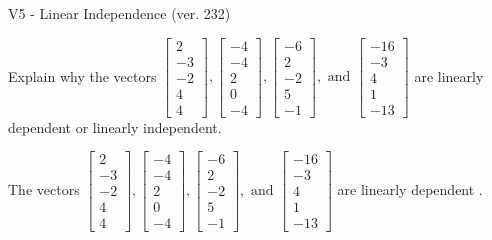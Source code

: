 \begin{exercise}
  \begin{exerciseTitle}V5 - Linear Independence (ver. 232)\end{exerciseTitle}
  \begin{exerciseStatement}
    Explain why the vectors \(\left[\begin{array}{r}
2 \\
-3 \\
-2 \\
4 \\
4
\end{array}\right] , \left[\begin{array}{r}
-4 \\
-4 \\
2 \\
0 \\
-4
\end{array}\right] , \left[\begin{array}{r}
-6 \\
2 \\
-2 \\
5 \\
-1
\end{array}\right] , \text{ and } \left[\begin{array}{r}
-16 \\
-3 \\
4 \\
1 \\
-13
\end{array}\right]\) are linearly dependent or linearly independent.	


  \end{exerciseStatement}
  \begin{exerciseAnswer}
   The vectors \(\left[\begin{array}{r}
2 \\
-3 \\
-2 \\
4 \\
4
\end{array}\right] , \left[\begin{array}{r}
-4 \\
-4 \\
2 \\
0 \\
-4
\end{array}\right] , \left[\begin{array}{r}
-6 \\
2 \\
-2 \\
5 \\
-1
\end{array}\right] , \text{ and } \left[\begin{array}{r}
-16 \\
-3 \\
4 \\
1 \\
-13
\end{array}\right]\) are 
  	 linearly dependent  .
  


  \end{exerciseAnswer}
\end{exercise}